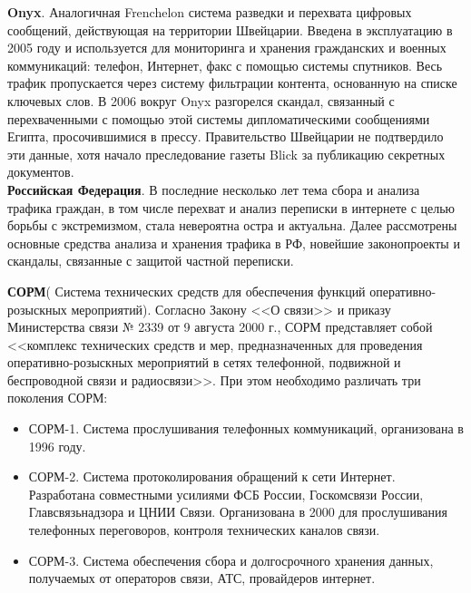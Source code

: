 	\textbf{Onyx}. Аналогичная Frenchelon система разведки и перехвата цифровых сообщений, действующая на территории Швейцарии. Введена в эксплуатацию в 2005 году	и используется для мониторинга и хранения гражданских и военных коммуникаций: телефон, Интернет, факс с помощью системы спутников. Весь трафик пропускается через систему фильтрации контента, основанную на списке ключевых слов. В 2006 вокруг Onyx разгорелся скандал, связанный с перехваченными с помощью этой системы дипломатическими сообщениями Египта, просочившимися в прессу. Правительство Швейцарии  не подтвердило эти данные, хотя начало преследование газеты  Blick за публикацию секретных документов. \cite{Onyx} %
	\\
	
	
	\textbf{Российская Федерация}.  В последние несколько лет тема сбора и анализа трафика граждан, в том числе перехват и анализ переписки в интернете с целью борьбы с экстремизмом, стала невероятна остра и актуальна. Далее рассмотрены основные средства анализа и хранения трафика  в РФ, новейшие законопроекты и скандалы, связанные с защитой частной переписки. 
	
	\textbf{СОРМ}( Система технических средств для обеспечения функций оперативно-розыскных мероприятий). Согласно Закону <<О связи>> и  приказу Министерства связи № 2339 от 9 августа 2000 г., СОРМ представляет собой <<комплекс технических средств и мер, предназначенных для проведения оперативно-розыскных мероприятий в сетях телефонной, подвижной и беспроводной связи и радиосвязи>>. %
	При этом необходимо различать три поколения СОРМ:
	\begin{itemize}
		\item СОРМ-1. Система прослушивания телефонных коммуникаций, организована в 1996 году.
		\item СОРМ-2.  Система протоколирования обращений к сети Интернет. Разработана совместными усилиями ФСБ России, Госкомсвязи России, Главсвязьнадзора и ЦНИИ Связи. Организована в 2000 для прослушивания телефонных переговоров, контроля технических каналов связи.
		\item СОРМ-3. Система обеспечения сбора и долгосрочного хранения данных, получаемых от операторов  связи, АТС,  провайдеров интернет.  
	\end{itemize}


